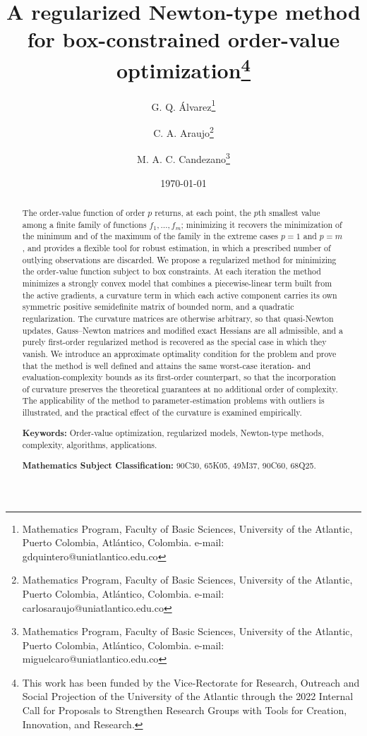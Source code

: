 \documentclass[11pt]{article}
\newcounter{alg}[section]
\begin{document}
\title{A regularized Newton-type method for box-constrained order-value optimization\thanks{This work has been funded by the Vice-Rectorate for Research, Outreach and Social Projection of the University of the Atlantic through the 2022 Internal Call for Proposals to Strengthen Research Groups with Tools for Creation, Innovation, and Research.}}

\author{
    G. Q. Álvarez\thanks{Mathematics Program, Faculty of Basic Sciences, University of the Atlantic, Puerto Colombia, Atlántico, Colombia. e-mail: gdquintero@uniatlantico.edu.co}
    \and 
    C. A. Araujo\thanks{Mathematics Program, Faculty of Basic Sciences, University of the Atlantic, Puerto Colombia, Atlántico, Colombia. e-mail: carlosaraujo@uniatlantico.edu.co}
    \and
    M. A. C. Candezano\thanks{Mathematics Program, Faculty of Basic Sciences, University of the Atlantic, Puerto Colombia, Atlántico, Colombia. e-mail: miguelcaro@uniatlantico.edu.co}
}

\date{\today}
\maketitle

\begin{abstract}
The order-value function of order $p$ returns, at each point, the $p$th smallest
value among a finite family of functions $f_1,\dots,f_m$; minimizing it recovers
the minimization of the minimum and of the maximum of the family in the extreme
cases $p=1$ and $p=m$, and provides a flexible tool for robust estimation, in
which a prescribed number of outlying observations are discarded. We propose a
regularized method for minimizing the order-value function subject to box
constraints. At each iteration the method minimizes a strongly convex model that
combines a piecewise-linear term built from the active gradients, a curvature
term in which each active component carries its own symmetric positive
semidefinite matrix of bounded norm, and a quadratic regularization. The
curvature matrices are otherwise arbitrary, so that quasi-Newton updates,
Gauss--Newton matrices and modified exact Hessians are all admissible, and a
purely first-order regularized method is recovered as the special case in which
they vanish.
We introduce an approximate optimality condition for the problem and prove that
the method is well defined and attains the same worst-case iteration- and
evaluation-complexity bounds as its first-order counterpart, so that the
incorporation of curvature preserves the theoretical guarantees at no additional
order of complexity. The applicability of the method to parameter-estimation
problems with outliers is illustrated, and the practical effect of the curvature
is examined empirically.

\medskip
\noindent
\textbf{Keywords:} Order-value optimization, regularized models,
Newton-type methods, complexity, algorithms, applications.

\medskip
\noindent
\textbf{Mathematics Subject Classification:} 90C30, 65K05, 49M37, 90C60, 68Q25.
\end{abstract}
\end{document}

